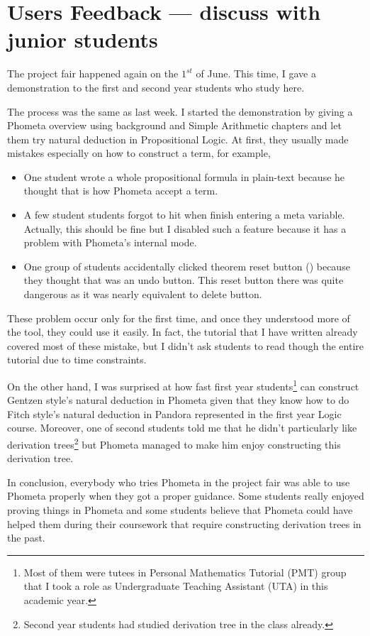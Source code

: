 \documentclass[master.tex]{subfiles}
\begin{document}
\section{Users Feedback --- discuss with junior students}

The project fair happened again on the $1^{st}$ of June. This time, I gave a
demonstration to the first and second year students who study here.

The process was the same as last week. I started the demonstration by giving a
Phometa overview using background and Simple Arithmetic chapters and let them
try natural deduction in Propositional Logic. At first, they usually
made mistakes especially on how to construct a term, for example,
\begin{itemize}
\item One student wrote a whole propositional formula in plain-text because he
  thought that is how Phometa accept a term.
\item A few student students forgot to hit  when finish entering
  a meta variable. Actually, this should be fine but I disabled such a feature
  because it has a problem with Phometa's internal mode.
\item One group of students accidentally clicked theorem reset button
  (\resetButton) because they thought that was an undo button. This reset button
  there was quite dangerous as it was nearly equivalent to delete button.
\end{itemize}
These problem occur only for the first time, and once they understood more of
the tool, they could use it easily. In fact, the tutorial that I have written
already covered most of these mistake, but I didn't ask students to read though
the entire tutorial due to time constraints.

On the other hand, I was surprised at how fast first year students\footnote{Most
  of them were tutees in Personal Mathematics Tutorial (PMT) group that I took a
  role as Undergraduate Teaching Assistant (UTA) in this academic year.} can
construct Gentzen style's natural deduction in Phometa given that they know how
to do Fitch style's natural deduction in Pandora represented in the first year
Logic course. Moreover, one of second students told me that he didn't
particularly like derivation trees\footnote{Second year students had studied
  derivation tree in the class already.} but Phometa managed to make him enjoy
constructing this derivation tree.

In conclusion, everybody who tries Phometa in the project fair was able to use
Phometa properly when they got a proper guidance. Some students really enjoyed
proving things in Phometa and some students believe that Phometa could have
helped them during their coursework that require constructing derivation trees
in the past.
\end{document}
